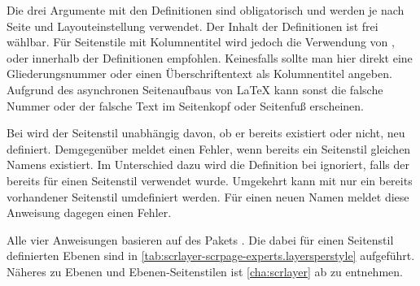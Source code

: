Die drei Argumente mit den Definitionen sind obligatorisch und werden je nach
Seite und Layouteinstellung verwendet. Der Inhalt der Definitionen ist frei
wählbar. Für Seitenstile mit Kolumnentitel wird jedoch die Verwendung von
,
 oder
 innerhalb der Definitionen
empfohlen. Keinesfalls sollte man hier direkt eine Gliederungsnummer oder
einen Überschriftentext als Kolumnentitel angeben. Aufgrund des asynchronen
Seitenaufbaus von \LaTeX{} kann sonst die falsche Nummer oder der falsche Text
im Seitenkopf oder Seitenfuß erscheinen.

Bei  wird der Seitenstil unabhängig
davon, ob er bereits existiert oder nicht, neu definiert. Demgegenüber meldet
 einen Fehler, wenn bereits ein Seitenstil gleichen Namens
existiert. Im Unterschied dazu wird die Definition bei
 ignoriert, falls der  bereits für einen
Seitenstil verwendet wurde. Umgekehrt kann mit  nur ein
bereits vorhandener Seitenstil umdefiniert werden. Für einen neuen Namen
meldet diese Anweisung dagegen einen Fehler.

Alle vier Anweisungen basieren auf
%
 des Pakets
\hyperref[cha:scrlayer]{}. Die dabei
für einen Seitenstil  definierten Ebenen sind in
\autoref{tab:scrlayer-scrpage-experts.layersperstyle} aufgeführt.  Näheres zu
Ebenen und Ebenen-Seitenstilen ist \autoref{cha:scrlayer} ab
 zu entnehmen.%

